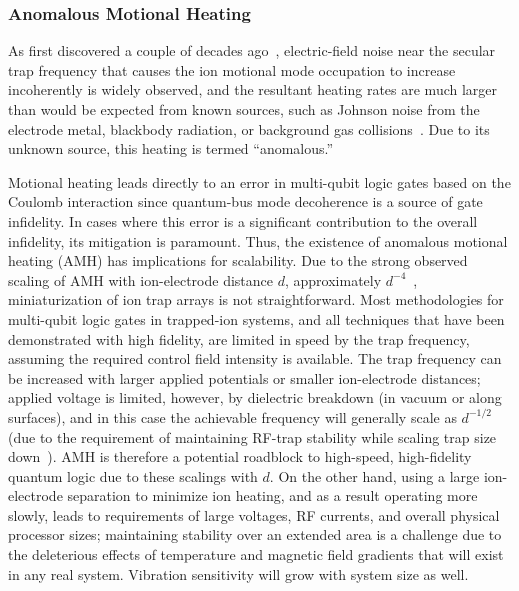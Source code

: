\documentclass[%
12pt,
 amsmath,amssymb,
]{revtex4-2}
\begin{document}
\subsubsection{Anomalous Motional Heating}
\label{AnomHeating}

As first discovered a couple of decades ago~\cite{turchette_2000}, electric-field noise near the secular trap frequency that causes the ion motional mode occupation to increase incoherently is widely observed, and the resultant heating rates are much larger than would be expected from known sources, such as Johnson noise from the electrode metal, blackbody radiation, or background gas collisions~\cite{brownnutt_2015}.  Due to its unknown source, this heating is termed ``anomalous.''

Motional heating leads directly to an error in multi-qubit logic gates \cite{MolmerSorensenGate} based on the Coulomb interaction since quantum-bus mode decoherence is a source of gate infidelity.  In cases where this error is a significant contribution to the overall infidelity, its mitigation is paramount. Thus, the existence of anomalous motional heating (AMH) has  implications for scalability.  Due to the strong observed scaling of AMH with ion-electrode distance $d$, approximately $d^{-4}$~\cite{PhysRevLett.97.103007_2006,hite_mckay_kotler_leibfried_wineland_pappas_2017,PhysRevLett.120.023201,PhysRevA.97.020302_2018},  miniaturization of ion trap arrays is not straightforward.  Most methodologies for multi-qubit logic gates in trapped-ion systems, and all techniques that have been demonstrated with high fidelity, are limited in speed by the trap frequency, assuming the required control field intensity is available.  The trap frequency can be increased with larger applied potentials or smaller ion-electrode distances; applied voltage is limited, however, by dielectric breakdown (in vacuum or along surfaces), and in this case the achievable frequency will generally scale as $d^{-1/2}$ (due to the requirement of maintaining RF-trap stability while scaling trap size down~\cite{NIST:SET:QIC:05}).  AMH is therefore a potential roadblock to high-speed, high-fidelity quantum logic due to these scalings with $d$. On the other hand, using a large ion-electrode separation to minimize ion heating, and as a result operating more slowly, leads to requirements of large voltages, RF currents, and overall physical processor sizes; maintaining stability over an extended area is a challenge due to the deleterious effects of temperature and magnetic field gradients that will exist in any real system.  Vibration sensitivity will grow with system size as well.
\end{document}
